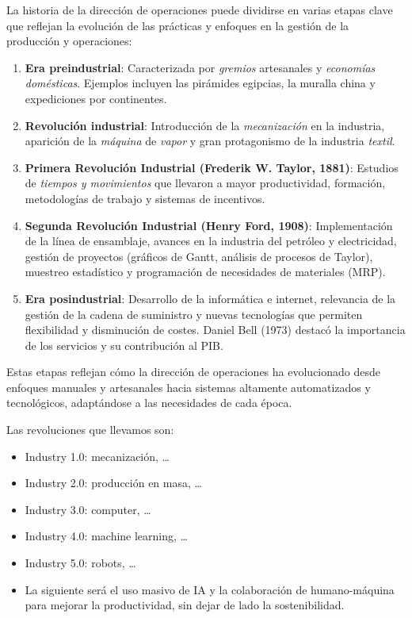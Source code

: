 \documentclass[12pt]{report} %
\providecommand{\tightlist}{%
  \setlength{\itemsep}{0pt}\setlength{\parskip}{0pt}}
\begin{document}
La historia de la dirección de operaciones puede dividirse en varias
etapas clave que reflejan la evolución de las prácticas y enfoques en la
gestión de la producción y operaciones:

\begin{enumerate}
\def\labelenumi{\arabic{enumi}.}
\item
  \textbf{Era preindustrial}: Caracterizada por \emph{gremios}
  artesanales y \emph{economías} \emph{domésticas}. Ejemplos incluyen
  las pirámides egipcias, la muralla china y expediciones por
  continentes.
\item
  \textbf{Revolución industrial}: Introducción de la \emph{mecanización}
  en la industria, aparición de la \emph{máquina} de \emph{vapor} y gran
  protagonismo de la industria \emph{textil}.
\item
  \textbf{Primera Revolución Industrial (Frederik W. Taylor, 1881)}:
  Estudios de \emph{tiempos y movimientos} que llevaron a mayor
  productividad, formación, metodologías de trabajo y sistemas de
  incentivos.
\item
  \textbf{Segunda Revolución Industrial (Henry Ford, 1908)}:
  Implementación de la línea de ensamblaje, avances en la industria del
  petróleo y electricidad, gestión de proyectos (gráficos de Gantt,
  análisis de procesos de Taylor), muestreo estadístico y programación
  de necesidades de materiales (MRP).
\item
  \textbf{Era posindustrial}: Desarrollo de la informática e internet,
  relevancia de la gestión de la cadena de suministro y nuevas
  tecnologías que permiten flexibilidad y disminución de costes. Daniel
  Bell (1973) destacó la importancia de los servicios y su contribución
  al PIB.
\end{enumerate}

Estas etapas reflejan cómo la dirección de operaciones ha evolucionado
desde enfoques manuales y artesanales hacia sistemas altamente
automatizados y tecnológicos, adaptándose a las necesidades de cada
época.

Las revoluciones que llevamos son:

\begin{itemize}
\tightlist
\item
  Industry 1.0: mecanización, \ldots{}\\
\item
  Industry 2.0: producción en masa, \ldots{}\\
\item
  Industry 3.0: computer, \ldots{}\\
\item
  Industry 4.0: machine learning, \ldots{}\\
\item
  Industry 5.0: robots, \ldots{}\\
\item
  La siguiente será el uso masivo de IA y la colaboración de
  humano-máquina para mejorar la productividad, sin dejar de lado la
  sostenibilidad.
\end{itemize}
\end{document}
